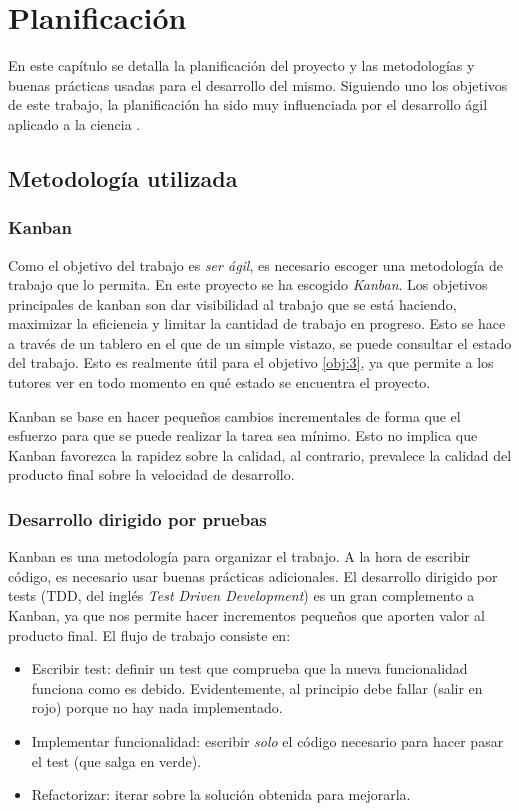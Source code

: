\chapter{Planificación}

En este capítulo se detalla la planificación del proyecto y las metodologías y buenas prácticas
usadas para el desarrollo del mismo. Siguiendo uno los objetivos de este trabajo, la planificación
ha sido muy influenciada por el desarrollo ágil aplicado a la ciencia \cite{desarrolloagil}.

\section{Metodología utilizada}

\subsection{Kanban}

Como el objetivo del trabajo es \textit{ser ágil}, es necesario escoger una metodología de trabajo que
lo permita. En este proyecto se ha escogido \textit{Kanban}. Los objetivos principales de kanban son dar
visibilidad al trabajo que se está haciendo, maximizar la eficiencia y limitar la cantidad de trabajo
en progreso. Esto se hace a través de un tablero en el que de un simple vistazo, se puede consultar el
estado del trabajo. Esto es realmente útil para el objetivo \ref{obj:3}, ya que permite a los tutores
ver en todo momento en qué estado se encuentra el proyecto.

Kanban se base en hacer pequeños cambios incrementales de forma que el esfuerzo para que se puede realizar
la tarea sea mínimo. Esto no implica que Kanban favorezca la rapidez sobre la calidad, al contrario,
prevalece la calidad del producto final sobre la velocidad de desarrollo.

\subsection{Desarrollo dirigido por pruebas}

Kanban es una metodología para organizar el trabajo. A la hora de escribir código, es necesario usar
buenas prácticas adicionales. El desarrollo dirigido por tests (TDD, del inglés \textit{Test Driven Development})
es un gran complemento a Kanban, ya que nos permite hacer incrementos pequeños que aporten valor al
producto final. El flujo de trabajo consiste en:

\begin{itemize}
    \item Escribir test: definir un test que comprueba que la nueva funcionalidad funciona como es debido.
          Evidentemente, al principio debe fallar (salir en rojo) porque no hay nada implementado.
    \item Implementar funcionalidad: escribir \textit{solo} el código necesario para hacer pasar el test
          (que salga en verde).
    \item Refactorizar: iterar sobre la solución obtenida para mejorarla.
\end{itemize}

